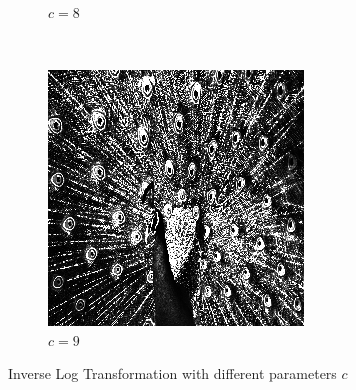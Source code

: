 \documentclass{article}
\begin{document}
\begin{enumerate}[label=(\alph*)]
\begin{figure}[!htb]
\begin{subfigure}[b]{0.3\textwidth}
            \caption{$c = 8$}
        \end{subfigure}
        ~
        \begin{subfigure}[b]{0.3\textwidth}
            \includegraphics[width=\textwidth]{img/ILT9.png}
            \caption{$c = 9$}
        \end{subfigure}
        \caption{Inverse Log Transformation with different parameters $c$}
        \label{Inverse Log Transformation with different parameters $c$}        
    \end{figure}
    

\end{enumerate}
\end{document}
